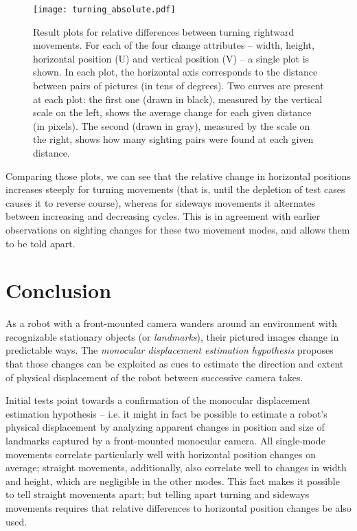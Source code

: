 \documentclass[twocolumn, 9pt]{jsproceedings}
\begin{document}
\begin{figure}[h!]
\texttt{[image: turning\_absolute.pdf]}
\caption{Result plots for relative differences between turning rightward movements. For each of the four change attributes -- width, height, horizontal position (U) and vertical position (V) -- a single plot is shown. In each plot, the horizontal axis corresponds to the distance between pairs of pictures (in tens of degrees). Two curves are present at each plot: the first one (drawn in black), measured by the vertical scale on the left, shows the average change for each given distance (in pixels). The second (drawn in gray), measured by the scale on the right, shows how many sighting pairs were found at each given distance.}
\label{fig:turning_absolute}
\end{figure}

Comparing those plots, we can see that the relative change in horizontal positions increases steeply for turning movements (that is, until the depletion of test cases causes it to reverse course), whereas for sideways movements it alternates between increasing and decreasing cycles. This is in agreement with earlier observations on sighting changes for these two movement modes, and allows them to be told apart.

\section{Conclusion}

As a robot with a front-mounted camera wanders around an environment with recognizable stationary objects (or {\it landmarks}), their pictured images change in predictable ways. The {\it monocular displacement estimation hypothesis} proposes that those changes can be exploited as cues to estimate the direction and extent of physical displacement of the robot between successive camera takes.

Initial tests point towards a confirmation of the monocular displacement estimation hypothesis -- i.e. it might in fact be possible to estimate a robot's physical displacement by analyzing apparent changes in position and size of landmarks captured by a front-mounted monocular camera. All single-mode movements correlate particularly well with horizontal position changes on average; straight movements, additionally, also correlate well to changes in width and height, which are negligible in the other modes. This fact makes it possible to tell straight movements apart; but telling apart turning and sideways movements requires that relative differences to horizontal position changes be also used.
\end{document}
